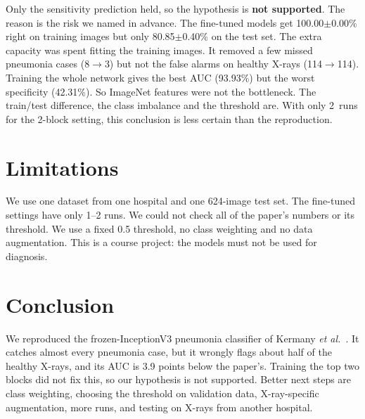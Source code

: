 \documentclass[conference]{IEEEtran}
\newcommand{\FPZero}{114}
\newcommand{\FNZero}{8}
\newcommand{\AblTwoSeeds}{2}
\newcommand{\AblTwoAcc}{80.85$\pm$0.40}
\newcommand{\AblTwoTrain}{100.00$\pm$0.00}
\newcommand{\FPTwo}{114}
\newcommand{\FNTwo}{3}
\newcommand{\AblAllSpec}{42.31}
\newcommand{\AblAllAUC}{93.93}
\begin{document}
Only the sensitivity prediction held, so the hypothesis is \textbf{not supported}. The reason is the risk we named in advance. The fine-tuned models get \AblTwoTrain\% right on training images but only \AblTwoAcc\% on the test set. The extra capacity was spent fitting the training images. It removed a few missed pneumonia cases (\FNZero$\to$\FNTwo) but not the false alarms on healthy X-rays (\FPZero$\to$\FPTwo). Training the whole network gives the best AUC (\AblAllAUC\%) but the worst specificity (\AblAllSpec\%). So ImageNet features were not the bottleneck. The train/test difference, the class imbalance and the threshold are. With only \AblTwoSeeds\ runs for the 2-block setting, this conclusion is less certain than the reproduction.

\section{Limitations}
We use one dataset from one hospital and one 624-image test set. The fine-tuned settings have only 1--2 runs. We could not check all of the paper's numbers or its threshold. We use a fixed 0.5 threshold, no class weighting and no data augmentation. This is a course project: the models must not be used for diagnosis.

\section{Conclusion}
We reproduced the frozen-InceptionV3 pneumonia classifier of Kermany \emph{et al.}~\cite{kermany}. It catches almost every pneumonia case, but it wrongly flags about half of the healthy X-rays, and its AUC is 3.9 points below the paper's. Training the top two blocks did not fix this, so our hypothesis is not supported. Better next steps are class weighting, choosing the threshold on validation data, X-ray-specific augmentation, more runs, and testing on X-rays from another hospital.
\end{document}
